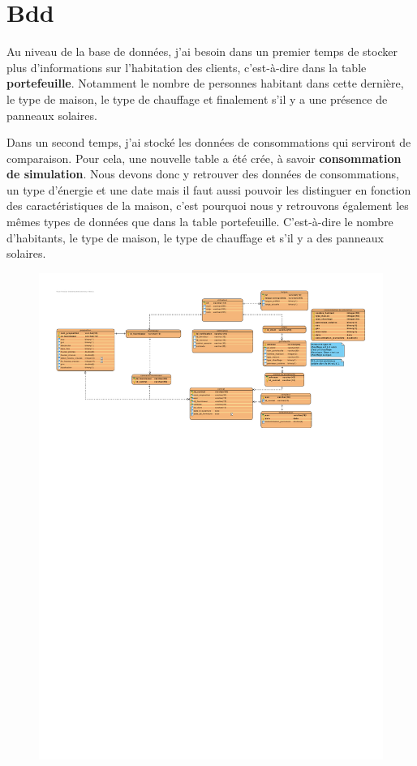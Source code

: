 \section{Bdd}

\begin{flushleft}
Au niveau de la base de données, j'ai besoin dans un premier temps de stocker plus d'informations sur l'habitation des clients, c'est-à-dire dans la table \textbf{portefeuille}. Notamment le nombre de personnes habitant dans cette dernière, le type de maison, le type de chauffage et finalement s'il y a une présence de panneaux solaires.
\end{flushleft}

\begin{flushleft}
Dans un second temps, j'ai stocké les données de consommations qui serviront de comparaison. Pour cela, une nouvelle table a été crée, à savoir \textbf{consommation de simulation}. Nous devons donc y retrouver des données de consommations, un type d'énergie et une date mais il faut aussi pouvoir les distinguer en fonction des caractéristiques de la maison, c'est pourquoi nous y retrouvons également les mêmes types de données que dans la table portefeuille. C'est-à-dire le nombre d'habitants, le type de maison, le type de chauffage et s'il y a des panneaux solaires.
\end{flushleft}

\begin{figure}[h]
\centering
\includegraphics[width=1.3\textwidth]{extension-adrien/Bdd/img/bdd.pdf}
\end{figure}
